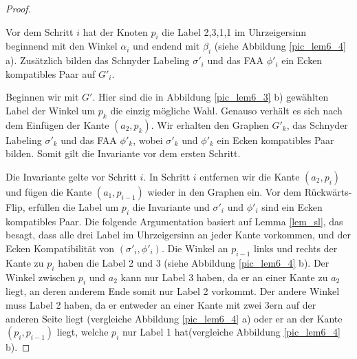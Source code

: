 \begin{proof}
\begin{invariant}
Vor dem Schritt $i$ hat der Knoten $p_i$ die Label 2,3,1,1 im Uhrzeigersinn beginnend mit den Winkel $\alpha_i$ und endend mit $\beta_i$ (siehe Abbildung \ref{pic_lem6_4} a). Zusätzlich bilden das Schnyder Labeling $\sigma'_i$ und das FAA $\phi'_i$ ein Ecken kompatibles Paar auf $G'_i$.
\end{invariant}

Beginnen wir mit $G'$. Hier sind die in Abbildung \ref{pic_lem6_3} b) gewählten Label der Winkel um $p_k$ die einzig mögliche Wahl. Genauso verhält es sich nach dem Einfügen der Kante $(a_2,p_k)$. Wir erhalten den Graphen $G'_{k}$, das Schnyder Labeling $\sigma'_{k}$ und das FAA $\phi'_{k}$, wobei $\sigma'_{k}$ und $\phi'_{k}$ ein Ecken kompatibles Paar bilden. Somit gilt die Invariante vor dem ersten Schritt.

Die Invariante gelte vor Schritt $i$. In Schritt $i$ entfernen wir die Kante $(a_2,p_i)$ und fügen die Kante $(a_1,p_{i-1})$ wieder in den Graphen ein. Vor dem Rückwärts-Flip, erfüllen die Label um $p_i$ die Invariante und $\sigma'_{i}$ und $\phi'_{i}$ sind ein Ecken kompatibles Paar. Die folgende Argumentation basiert auf Lemma \ref{lem_sl}, das besagt, dass alle drei Label im Uhrzeigersinn an jeder Kante vorkommen, und der Ecken Kompatibilität von $(\sigma'_{i},\phi'_{i})$. Die Winkel an $p_{i-1}$ links und rechts der Kante zu $p_i$ haben die Label 2 und 3 (siehe Abbildung \ref{pic_lem6_4} b). Der Winkel zwischen $p_i$ und $a_2$ kann nur Label 3 haben, da er an einer Kante zu $a_2$ liegt, an deren anderem Ende somit nur Label 2 vorkommt. Der andere Winkel muss Label 2 haben, da er entweder an einer Kante mit zwei 3ern auf der anderen Seite liegt (vergleiche Abbildung \ref{pic_lem6_4} a) oder er an der Kante $(p_i,p_{i-1})$ liegt, welche $p_i$ nur Label 1 hat(vergleiche Abbildung \ref{pic_lem6_4} b). 


\end{proof}
